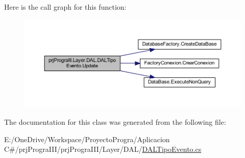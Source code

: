 Here is the call graph for this function\+:
\nopagebreak
\begin{figure}[H]
\begin{center}
\leavevmode
\includegraphics[width=350pt]{classprj_progra_i_i_i_1_1_layer_1_1_d_a_l_1_1_d_a_l_tipo_evento_a1265817c512c688caab86130dd21b39a_cgraph}
\end{center}
\end{figure}


The documentation for this class was generated from the following file\+:\begin{DoxyCompactItemize}
\item 
E\+:/\+One\+Drive/\+Workspace/\+Proyecto\+Progra/\+Aplicacion C\#/prj\+Progra\+I\+I\+I/prj\+Progra\+I\+I\+I/\+Layer/\+D\+A\+L/\hyperlink{_d_a_l_tipo_evento_8cs}{D\+A\+L\+Tipo\+Evento.\+cs}\end{DoxyCompactItemize}
